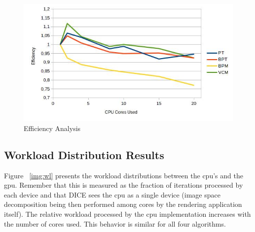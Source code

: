 \begin{figure}[H]
\centering
\includegraphics[width=\linewidth]{img/efficiency.jpg}
\caption{\label{img:efficiency} Efficiency Analysis}
\end{figure}

\subsection{\label{subsec:wl} Workload Distribution Results}

Figure ~\ref{img:wl} presents the workload distributions between the \gls{cpu}'s and the \gls{gpu}.  Remember that this is measured as the fraction of iterations processed by each device and that DICE sees the \gls{cpu} as a single device (image space decomposition being then performed among cores by the rendering application itself). The relative workload processed by the \gls{cpu} implementation increases with the number of cores used. This behavior is similar for all four algorithms.

